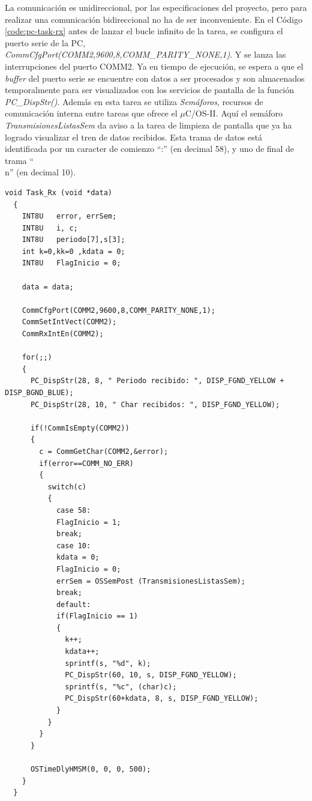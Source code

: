 \documentclass[11pt,a4paper,oneside]{article}
\def\uCOS{$\mu$C/OS-II\texttrademark}
\begin{document}
La comunicación es unidireccional, por las especificaciones del proyecto, pero para realizar una comunicación bidireccional no ha de ser inconveniente. En el Código \ref{code:pc-task-rx} antes de lanzar el bucle infinito de la tarea, se configura el puerto serie de la PC, \emph{CommCfgPort(COMM2,9600,8,COMM\_PARITY\_NONE,1)}. Y se lanza las interrupciones del puerto COMM2. Ya en tiempo de ejecución, se espera a que el \textsl{buffer} del puerto serie se encuentre con datos a ser procesados y son almacenados temporalmente para ser visualizados con los servicios de pantalla de la función \emph{PC\_DispStr()}. Además en esta tarea se utiliza \emph{Semáforos}, recursos de comunicación interna entre tareas que ofrece el \uCOS. Aquí el semáforo \emph{TransmisionesListasSem} da aviso a la tarea de limpieza de pantalla que ya ha logrado visualizar el tren de datos recibidos. Esta trama de datos está identificada  por un caracter de comienzo ``:'' (en decimal 58), y uno de final de trama ``\\n'' (en decimal 10).

\begin{lstlisting}[caption={Tarea de la recepción de datos en la PC (\emph{Task\_Rx()})},label=code:pc-task-rx]
  void Task_Rx (void *data)
  {
    INT8U	error, errSem;
    INT8U	i, c;
    INT8U	periodo[7],s[3];
    int k=0,kk=0 ,kdata = 0;
    INT8U	FlagInicio = 0;
    
    data = data;
    
    CommCfgPort(COMM2,9600,8,COMM_PARITY_NONE,1);
    CommSetIntVect(COMM2);
    CommRxIntEn(COMM2);
    
    for(;;)
    {
      PC_DispStr(28, 8, " Periodo recibido: ", DISP_FGND_YELLOW + DISP_BGND_BLUE);
      PC_DispStr(28, 10, " Char recibidos: ", DISP_FGND_YELLOW);
      
      if(!CommIsEmpty(COMM2))
      {
        c = CommGetChar(COMM2,&error);
        if(error==COMM_NO_ERR)
        {
          switch(c)
          {
            case 58:
            FlagInicio = 1;
            break;
            case 10:
            kdata = 0;
            FlagInicio = 0;
            errSem = OSSemPost (TransmisionesListasSem);
            break;
            default:
            if(FlagInicio == 1)
            {
              k++;
              kdata++;
              sprintf(s, "%d", k);
              PC_DispStr(60, 10, s, DISP_FGND_YELLOW);
              sprintf(s, "%c", (char)c);
              PC_DispStr(60+kdata, 8, s, DISP_FGND_YELLOW);
            }
          }
        }
      }
      
      OSTimeDlyHMSM(0, 0, 0, 500);
    }
  }
\end{lstlisting}
\end{document}
